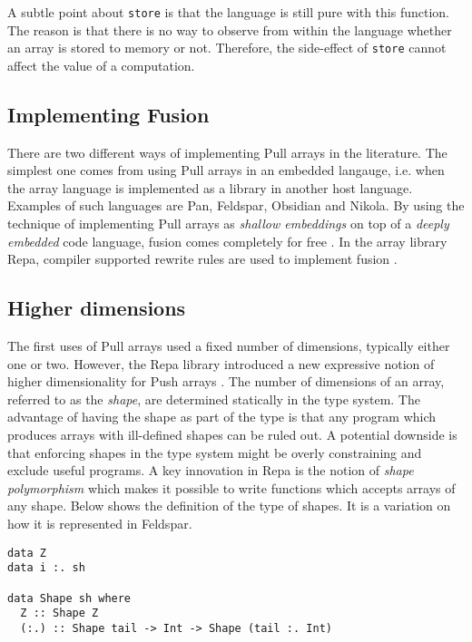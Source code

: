 \documentclass[preprint]{sigplanconf}
\begin{document}
A subtle point about \verb!store! is that the language is still pure
with this function. The reason is that there is no way to observe from
within the language whether an array is stored to memory or
not. Therefore, the side-effect of \verb!store! cannot affect the
value of a computation.

\subsection{Implementing Fusion}

There are two different ways of implementing Pull arrays in the
literature. The simplest one comes from using Pull arrays in an
embedded langauge, i.e. when the array language is implemented as a
library in another host language. Examples of such languages are
Pan\cite{elliott2003compiling}, Feldspar\cite{Axelsson:2010:Feldspar},
Obsidian\cite{Svensson:2011:Obsidian} and
Nikola\cite{Mainland:2010:Nikola}. By using the technique of
implementing Pull arrays as \emph{shallow embeddings} on top of a
\emph{deeply embedded} code language, fusion comes completely for free
\cite{svenningsson2013combining}.
In the array library Repa\cite{keller2010regular}, compiler supported
rewrite rules are used to implement fusion \cite{jones2001playing}.


\subsection{Higher dimensions}

The first uses of Pull arrays used a fixed number of dimensions,
typically either one or two. However, the Repa library introduced a
new expressive notion of higher dimensionality for Push arrays
\cite{keller2010regular}. The number of dimensions of an array, referred
to as the \emph{shape}, are determined statically in the type
system. The advantage of having the shape as part of the type is that
any program which produces arrays with ill-defined shapes can be ruled
out. A potential downside is that enforcing shapes in the type system might
be overly constraining and exclude useful programs. A key innovation in
Repa is the notion of \emph{shape polymorphism} which makes it
possible to write functions which accepts arrays of any shape. Below
shows the definition of the type of shapes. It is a variation on how
it is represented in Feldspar.

\begin{verbatim}
data Z
data i :. sh

data Shape sh where
  Z :: Shape Z
  (:.) :: Shape tail -> Int -> Shape (tail :. Int)
\end{verbatim}
\end{document}
